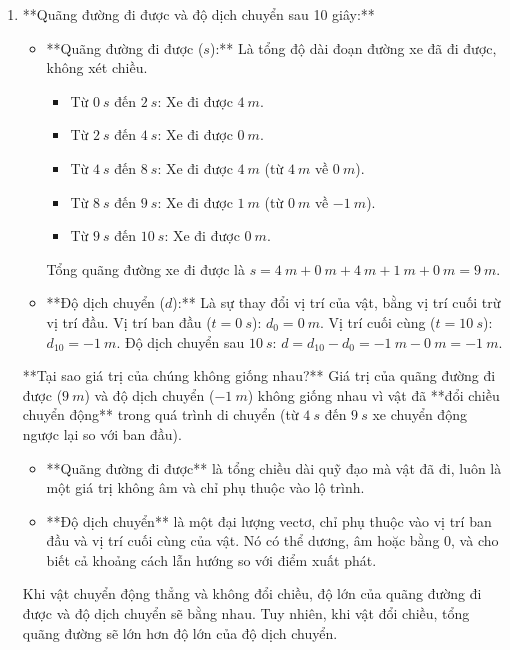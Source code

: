 \begin{vd}
{\begin{enumerate}[label=\alph*)]
			\item **Quãng đường đi được và độ dịch chuyển sau 10 giây:**
			\begin{itemize}
				\item **Quãng đường đi được ($s$):** Là tổng độ dài đoạn đường xe đã đi được, không xét chiều.
				\begin{itemize}
					\item Từ $\SI{0}{s}$ đến $\SI{2}{s}$: Xe đi được $\SI{4}{m}$.
					\item Từ $\SI{2}{s}$ đến $\SI{4}{s}$: Xe đi được $\SI{0}{m}$.
					\item Từ $\SI{4}{s}$ đến $\SI{8}{s}$: Xe đi được $\SI{4}{m}$ (từ $\SI{4}{m}$ về $\SI{0}{m}$).
					\item Từ $\SI{8}{s}$ đến $\SI{9}{s}$: Xe đi được $\SI{1}{m}$ (từ $\SI{0}{m}$ về $\SI{-1}{m}$).
					\item Từ $\SI{9}{s}$ đến $\SI{10}{s}$: Xe đi được $\SI{0}{m}$.
				\end{itemize}
				Tổng quãng đường xe đi được là $s = \SI{4}{m} + \SI{0}{m} + \SI{4}{m} + \SI{1}{m} + \SI{0}{m} = \SI{9}{m}.$
				
				\item **Độ dịch chuyển ($d$):** Là sự thay đổi vị trí của vật, bằng vị trí cuối trừ vị trí đầu.
				Vị trí ban đầu ($t=\SI{0}{s}$): $d_0 = \SI{0}{m}$.
				Vị trí cuối cùng ($t=\SI{10}{s}$): $d_{10} = \SI{-1}{m}$.
				Độ dịch chuyển sau $\SI{10}{s}$: $d = d_{10} - d_0 = \SI{-1}{m} - \SI{0}{m} = \SI{-1}{m}.$
			\end{itemize}
			
			**Tại sao giá trị của chúng không giống nhau?**
			Giá trị của quãng đường đi được ($\SI{9}{m}$) và độ dịch chuyển ($\SI{-1}{m}$) không giống nhau vì vật đã **đổi chiều chuyển động** trong quá trình di chuyển (từ $\SI{4}{s}$ đến $\SI{9}{s}$ xe chuyển động ngược lại so với ban đầu).
			\begin{itemize}
				\item **Quãng đường đi được** là tổng chiều dài quỹ đạo mà vật đã đi, luôn là một giá trị không âm và chỉ phụ thuộc vào lộ trình.
				\item **Độ dịch chuyển** là một đại lượng vectơ, chỉ phụ thuộc vào vị trí ban đầu và vị trí cuối cùng của vật. Nó có thể dương, âm hoặc bằng 0, và cho biết cả khoảng cách lẫn hướng so với điểm xuất phát.
			\end{itemize}
			Khi vật chuyển động thẳng và không đổi chiều, độ lớn của quãng đường đi được và độ dịch chuyển sẽ bằng nhau. Tuy nhiên, khi vật đổi chiều, tổng quãng đường sẽ lớn hơn độ lớn của độ dịch chuyển.
		\end{enumerate}}
	\end{vd}
